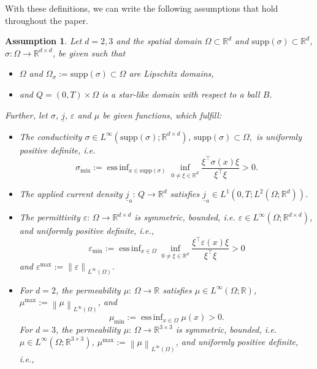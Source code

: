 \documentclass[a4paper,11pt]{article}
\newtheorem{assumption}[theorem]{Assumption}
\newcommand{\R}{\mathbb R}
\DeclareMathOperator*{\essinf}{ess\,inf}
\renewcommand{\vec}[1]{\underline{#1}}
\newcommand{\norm}[1]{{\left\lVert{#1}\right\rVert}}
\begin{document}
With these definitions, we can write the following assumptions that hold throughout the paper.
\begin{assumption} \label{A:Assumptions_all}
	Let $d=2,3$ and the spatial domain $\Omega \subset \R^d$ and  $\mathrm{supp}(\sigma)\subset \R^d$, $\sigma: \Omega\to \R^{d\times d}$, be given such that
	\begin{itemize}
		\item $\Omega$ and $\Omega_\sigma := \mathrm{supp}(\sigma)\subset\Omega$ are Lipschitz domains,
		\item and $Q = (0,T) \times \Omega$ is a star-like domain with respect to a ball $B$.
	\end{itemize}
	Further, let $\sigma$, $\vec j$, $\varepsilon$ and $\mu$ be given functions, which fulfill:
	\begin{itemize}
		\item The conductivity $\sigma \in L^\infty(\mathrm{supp}(\sigma); \R^{d \times d})$, $\mathrm{supp}(\sigma)\subset \Omega,$ is uniformly positive definite, i.e.
		\begin{equation*}
			\sigma_{\min} := \essinf_{x\in \mathrm{supp}(\sigma)} \inf_{0 \ne \xi\in \R^d} \frac{\xi^\top \sigma(x) \xi}{\xi^\top\xi} > 0.
		\end{equation*}		
		\item The applied current density $\vec j_a \colon \, Q \to \R^d$ satisfies $\vec j_a \in L^1(0,T;L^2(\Omega;\R^d))$.
		\item The permittivity $\varepsilon \colon \, \Omega \to \R^{d \times d}$ is symmetric, bounded, i.e. $\varepsilon \in L^\infty(\Omega; \R^{d \times d})$, and uniformly positive definite, i.e., 
		\begin{equation*}
			\varepsilon_{\min} := \essinf_{x\in \Omega} \inf_{0 \ne \xi\in \R^d} \frac{\xi^\top \varepsilon(x) \xi}{\xi^\top\xi} > 0
		\end{equation*}
		and $\varepsilon^{\max}:= \norm{\varepsilon}_{L^\infty(\Omega)}$.
		\item For $d=2$, the permeability $\mu \colon \, \Omega \to \R$ satisfies $\mu \in L^\infty(\Omega;\R)$, $\mu^{\max}:= \norm{\mu}_{L^\infty(\Omega)}$, and
		\begin{equation*}
			\mu_{\min} := \essinf_{x\in \Omega} \mu(x)  > 0.
		\end{equation*}		
		For $d=3$, the permeability $\mu \colon \, \Omega \to \R^{3 \times 3}$  is symmetric, bounded, i.e. $\mu \in L^\infty(\Omega; \R^{3 \times 3})$,  $\mu^{\max}:= \norm{\mu}_{L^\infty(\Omega)}$, and uniformly positive definite, i.e., 

\end{itemize}
\end{assumption}
\end{document}
